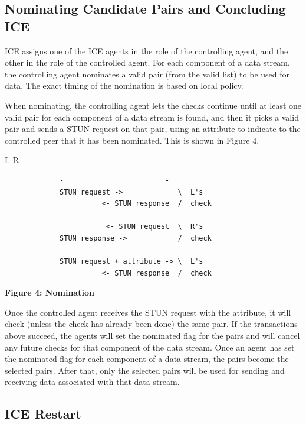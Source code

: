 \documentclass{article}
\begin{document}
\subsection{Nominating Candidate Pairs and Concluding ICE}

ICE assigns one of the ICE agents in the role of the controlling agent, and the other in the role of the controlled agent.  For each component of a data stream, the controlling agent nominates a valid pair (from the valid list) to be used for data.  The exact timing of the nomination is based on local policy.

When nominating, the controlling agent lets the checks continue until at least one valid pair for each component of a data stream is found, and then it picks a valid pair and sends a STUN request on that pair, using an attribute to indicate to the controlled peer that it has been nominated.  This is shown in Figure 4.

L                        R

\begin{verbatim}
             -                        -
             STUN request ->             \  L's
                       <- STUN response  /  check

                        <- STUN request  \  R's
             STUN response ->            /  check

             STUN request + attribute -> \  L's
                       <- STUN response  /  check

\end{verbatim}

\begin{center}
\textbf{Figure 4: Nomination}
\end{center}

Once the controlled agent receives the STUN request with the attribute, it will check (unless the check has already been done) the same pair.  If the transactions above succeed, the agents will set the nominated flag for the pairs and will cancel any future checks for that component of the data stream.  Once an agent has set the nominated flag for each component of a data stream, the pairs become the selected pairs.  After that, only the selected pairs will be used for sending and receiving data associated with that data stream.

\subsection{ICE Restart}
\end{document}
